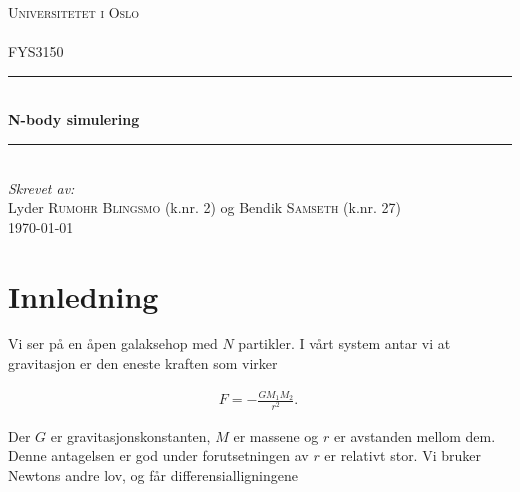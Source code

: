 \documentclass[11pt, twocolumn]{article}
\begin{document}
\begin{titlepage}
  \newcommand{\HRule}{\rule{\linewidth}{0.5mm}}
  \center
  \textsc{\LARGE Universitetet i Oslo}\\[1.5cm] %
  \textsc{\Large }\\[0.5cm] %
  \textsc{\large FYS3150}\\[0.5cm] %
  \HRule \\[0.4cm]
  { \huge \bfseries N-body simulering}\\[0.4cm]
  \HRule \\[1.5cm]
  \Large \emph{Skrevet av:}\\
  Lyder \textsc{Rumohr Blingsmo} (k.nr. 2) og Bendik \textsc{Samseth} (k.nr. 27)\\[3cm]
  {\large \today}\\[3cm]
  \vfill
\end{titlepage}

\section{Innledning}
Vi ser på en åpen galaksehop med $N$ partikler. I vårt system antar vi at 
gravitasjon er den eneste kraften som virker

\begin{align}
 F = -\frac{GM_1M_2}{r^2}.\
\end{align}

Der $G$ er gravitasjonskonstanten, $M$ er massene og $r$ er avstanden mellom dem. 
Denne antagelsen er god under forutsetningen av $r$ er relativt stor. Vi bruker
Newtons andre lov, og får differensialligningene 
\end{document}
